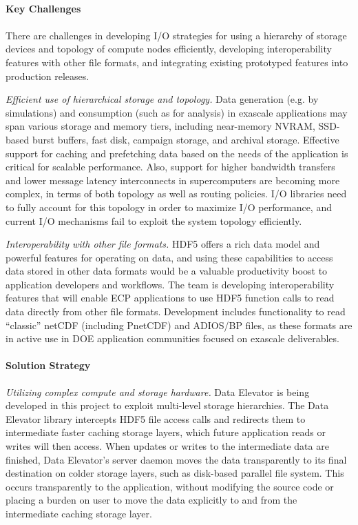 \paragraph{Key  Challenges}
\paragraph{}
There are challenges in developing I/O strategies for using a hierarchy of storage devices and topology of compute nodes efficiently, developing interoperability features with other file formats, and integrating existing prototyped features into production releases. 

\textit{Efficient use of hierarchical storage and topology.} Data generation (e.g. by simulations) and consumption (such as for analysis) in exascale applications may span various storage and memory tiers, including near-memory NVRAM, SSD-based burst buffers, fast disk, campaign storage, and archival storage. Effective support for caching and prefetching data based on the needs of the application is critical for scalable performance. Also, support for higher bandwidth transfers and lower message latency interconnects in supercomputers are becoming more complex, in terms of both topology as well as routing policies. I/O libraries need to fully account for this topology in order to
maximize I/O performance, and current I/O mechanisms fail to exploit the system topology efficiently.

\textit{Interoperability with other file formats.} HDF5 offers a rich data model and powerful features for operating on data, and using these capabilities to access data stored in other data formats would be a valuable productivity boost to application developers and workflows. The team is developing  interoperability features that will enable ECP applications to use HDF5 function calls to read data directly from other file formats. Development includes functionality to read “classic” netCDF (including PnetCDF) and ADIOS/BP files, as these formats are in active use in DOE application communities focused on exascale deliverables. 

\paragraph{Solution Strategy}

\textit{Utilizing complex compute and storage hardware. } Data Elevator is being developed in this project to exploit multi-level storage hierarchies. The Data Elevator library intercepts HDF5 file access calls and redirects them to intermediate faster caching storage layers, which future application reads or writes will then access. When updates or writes to the intermediate data are finished, Data Elevator's server daemon moves the data transparently to its final destination on colder storage layers, such as disk-based parallel file system.  This occurs transparently to the application, without modifying the source code or placing a burden on user to move the data explicitly to and from the intermediate caching storage layer.

